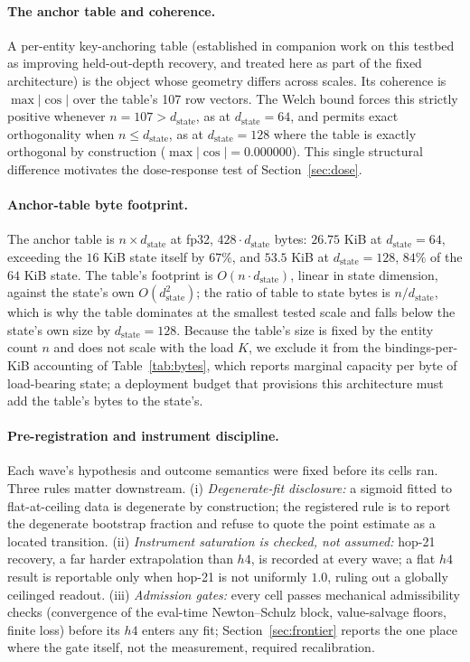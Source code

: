\paragraph{The anchor table and coherence.} A per-entity key-anchoring
table (established in companion work on this testbed as improving
held-out-depth recovery, and treated here as part of the fixed
architecture) is the
object whose geometry differs across scales. Its coherence is
$\max\lvert\cos\rvert$ over the table's 107 row vectors. The Welch bound
\citep{welch1974lower} forces this strictly positive whenever
$n = 107 > d_{\mathrm{state}}$, as at $d_{\mathrm{state}}=64$, and permits
exact orthogonality when $n \le d_{\mathrm{state}}$, as at
$d_{\mathrm{state}}=128$ where the table is exactly orthogonal by
construction ($\max\lvert\cos\rvert = 0.000000$). %
This single structural difference motivates the dose-response test of
Section~\ref{sec:dose}.

\paragraph{Anchor-table byte footprint.} The anchor table is
$n \times d_{\mathrm{state}}$ at fp32, $428 \cdot d_{\mathrm{state}}$
bytes: $26.75$ KiB at $d_{\mathrm{state}}=64$, exceeding the $16$ KiB
state itself by $67\%$, and $53.5$ KiB at $d_{\mathrm{state}}=128$,
$84\%$ of the $64$ KiB state. %
The table's footprint is $O(n \cdot d_{\mathrm{state}})$, linear in
state dimension, against the state's own $O(d_{\mathrm{state}}^2)$; the
ratio of table to state bytes is $n/d_{\mathrm{state}}$, which is why
the table dominates at the smallest tested scale and falls below the
state's own size by $d_{\mathrm{state}}=128$. Because the table's size
is fixed by the entity count $n$ and does not scale with the load $K$,
we exclude it from the bindings-per-KiB accounting of
Table~\ref{tab:bytes}, which reports marginal capacity per byte of
load-bearing state; a deployment budget that provisions this
architecture must add the table's bytes to the state's.

\paragraph{Pre-registration and instrument discipline.} Each wave's
hypothesis and outcome semantics were fixed before its cells ran. Three
rules matter downstream. (i) \emph{Degenerate-fit disclosure:} a sigmoid
fitted to flat-at-ceiling data is degenerate by construction; the
registered rule is to report the degenerate bootstrap fraction and refuse
to quote the point estimate as a located transition. (ii)
\emph{Instrument saturation is checked, not assumed:} hop-21 recovery, a
far harder extrapolation than $h4$, is recorded at every wave; a flat
$h4$ result is reportable only when hop-21 is not uniformly $1.0$, ruling
out a globally ceilinged readout. (iii) \emph{Admission gates:} every cell
passes mechanical admissibility checks (convergence of the eval-time
Newton--Schulz block, value-salvage floors, finite loss) before its $h4$
enters any fit; Section~\ref{sec:frontier} reports the one place where the
gate itself, not the measurement, required recalibration.
